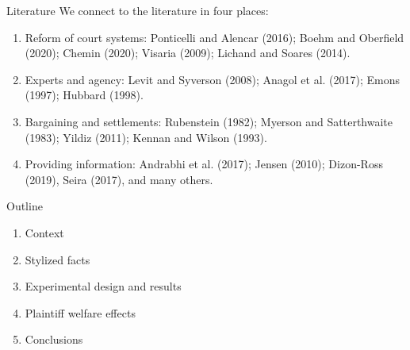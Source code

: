 \documentclass[9pt]{beamer}
\begin{document}
\begin{frame}{Literature}
We connect to the literature in four places:
\vspace{2mm}
\begin{enumerate}
    \item Reform of court systems: Ponticelli and Alencar (2016); Boehm and Oberfield (2020); Chemin (2020); Visaria (2009); Lichand and Soares (2014).
    \vspace{2mm}
    \item Experts and agency: Levit and Syverson (2008); Anagol et al. (2017); Emons (1997); Hubbard (1998).
    \vspace{2mm}
    \item Bargaining and settlements: Rubenstein (1982); Myerson and Satterthwaite (1983); Yildiz (2011); Kennan and Wilson (1993). %
    \vspace{2mm}
    \item Providing information: Andrabhi et al. (2017);  Jensen (2010); Dizon-Ross (2019), Seira (2017), and many others.

\end{enumerate}
    
\end{frame}

\begin{frame}{Outline}
  \begin{enumerate}
      \item Context
      \vspace{.1in}
      \item Stylized facts
       \vspace{.1in}
      \item Experimental design and results
       \vspace{.1in}
      \item Plaintiff welfare effects
       \vspace{.1in}
      \item Conclusions
  \end{enumerate}
\end{frame}
\end{document}
